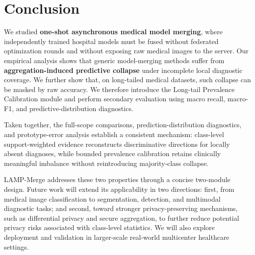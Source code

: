 \documentclass[letterpaper]{article} %
\begin{document}
\section{Conclusion}

We studied \textbf{one-shot asynchronous medical model merging}, where independently trained hospital models must be fused without federated optimization rounds and without exposing raw medical images to the server. Our empirical analysis shows that generic model-merging methods suffer from \textbf{aggregation-induced predictive collapse} under incomplete local diagnostic coverage. We further show that, on long-tailed medical datasets, such collapse can be masked by raw accuracy. We therefore introduce the Long-tail Prevalence Calibration module and perform secondary evaluation using macro recall, macro-F1, and predictive-distribution diagnostics\cite{BUDA2018249,5597285}.

Taken together, the full-scope comparisons, prediction-distribution diagnostics, and prototype-error analysis establish a consistent mechanism: class-level support-weighted evidence reconstructs discriminative directions for locally absent diagnoses, while bounded prevalence calibration retains clinically meaningful imbalance without reintroducing majority-class collapse.

LAMP-Merge addresses these two properties through a concise two-module design. Future work will extend its applicability in two directions: first, from medical image classification to segmentation, detection, and multimodal diagnostic tasks; and second, toward stronger privacy-preserving mechanisms, such as differential privacy and secure aggregation, to further reduce potential privacy risks associated with class-level statistics\cite{kaissis2020secure,geyer2017differentially,abadi2016deep}. We will also explore deployment and validation in larger-scale real-world multicenter healthcare settings.
\end{document}
